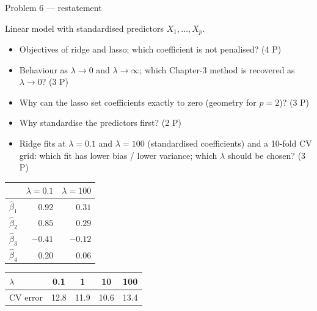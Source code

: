 \documentclass[aspectratio=169,11pt]{beamer}
\begin{document}
\begin{frame}{Problem 6 --- restatement}
  \begin{exercise}
    Linear model with standardised predictors $X_1,\dots,X_p$.
    \begin{itemize}
      \item[(a)] Objectives of ridge and lasso; which coefficient is not penalised? \hfill (4 P)
      \item[(b)] Behaviour as $\lambda\to 0$ and $\lambda\to\infty$; which Chapter-3 method
        is recovered as $\lambda\to 0$? \hfill (3 P)
      \item[(c)] Why can the lasso set coefficients exactly to zero (geometry for $p=2$)? \hfill (3 P)
      \item[(d)] Why standardise the predictors first? \hfill (2 P)
      \item[(e)] Ridge fits at $\lambda=0.1$ and $\lambda=100$ (standardised coefficients)
        and a 10-fold CV grid: which fit has lower bias / lower variance; which $\lambda$
        should be chosen? \hfill (3 P)
    \end{itemize}
    \vspace{-4.5mm}
    \begin{center}
    \scriptsize
    \begin{tabular}{lrr}
      \toprule
       & $\lambda=0.1$ & $\lambda=100$\\
      \midrule
      $\hat{\beta}_1$ & $0.92$ & $0.31$\\
      $\hat{\beta}_2$ & $0.85$ & $0.29$\\
      $\hat{\beta}_3$ & $-0.41$ & $-0.12$\\
      $\hat{\beta}_4$ & $0.20$ & $0.06$\\
      \bottomrule
    \end{tabular}
    \hspace{10mm}
    \begin{tabular}{lcccc}
      \toprule
      $\lambda$ & 0.1 & 1 & 10 & 100\\
      \midrule
      CV error & 12.8 & 11.9 & 10.6 & 13.4\\
      \bottomrule
    \end{tabular}
    \end{center}
  \end{exercise}
\end{frame}
\end{document}
